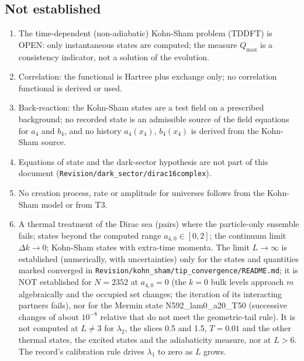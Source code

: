 \documentclass[11pt]{article}
\begin{document}
\subsection{Not established}

\begin{enumerate}
\item The time-dependent (non-adiabatic) Kohn-Sham problem (TDDFT) is OPEN: only instantaneous states are computed; the measure $Q_{\max}$ is a consistency indicator, not a solution of the evolution.
\item Correlation: the functional is Hartree plus exchange only; no correlation functional is derived or used.
\item Back-reaction: the Kohn-Sham states are a test field on a prescribed background; no recorded state is an admissible source of the field equations for $a_4$ and $b_4$, and no history $a_4(x_4)$, $b_4(x_4)$ is derived from the Kohn-Sham source.
\item Equations of state and the dark-sector hypothesis are not part of this document (\texttt{Revision\allowbreak{}/dark\_se\allowbreak{}ctor/dir\allowbreak{}ac16comp\allowbreak{}lex}).
\item No creation process, rate or amplitude for universes follows from the Kohn-Sham model or from T3.
\item A thermal treatment of the Dirac sea (pairs) where the particle-only ensemble fails; states beyond the computed range $a_{4,0} \in [0, 2]$; the continuum limit $\Delta k \to 0$; Kohn-Sham states with extra-time momenta. The limit $L \to \infty$ is established (numerically, with uncertainties) only for the states and quantities marked converged in \texttt{Revision\allowbreak{}/kohn\_sh\allowbreak{}am/tip\_c\allowbreak{}onvergen\allowbreak{}ce/READM\allowbreak{}E.md}; it is NOT established for $N = 2352$ at $a_{4,0} = 0$ (the $k = 0$ bulk levels approach $m$ algebraically and the occupied set changes; the iteration of its interacting partners fails), nor for the Mermin state N592\_lam0\_a20\_T50 (successive changes of about $10^{-8}$ relative that do not meet the geometric-tail rule). It is not computed at $L \neq 3$ for $\lambda_2$, the slices 0.5 and 1.5, $T = 0.01$ and the other thermal states, the excited states and the adiabaticity measure, nor at $L > 6$. The record's calibration rule drives $\lambda_1$ to zero as $L$ grows.
\end{enumerate}
\end{document}
